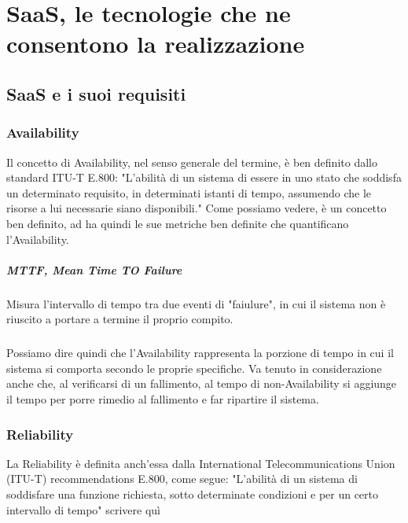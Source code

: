 \chapter{SaaS, le tecnologie che ne consentono la realizzazione}

\section{SaaS e i suoi requisiti}

\subsection{Availability}
Il concetto di Availability, nel senso generale del termine, è ben definito dallo standard ITU-T E.800: "L'abilità di un sistema di essere in uno stato che soddisfa un determinato requisito, in determinati istanti di tempo, assumendo che le risorse a lui necessarie siano disponibili." Come possiamo vedere, è un concetto ben definito, ad ha quindi le sue metriche ben definite che quantificano l'Availability. 

\paragraph{MTTF, Mean Time TO Failure}
Misura l'intervallo di tempo tra due eventi di "faiulure", in cui il sistema non è riuscito a portare a termine il proprio compito.

\paragraph{}
Possiamo dire quindi che l'Availability rappresenta la porzione di tempo in cui il sistema si comporta secondo le proprie specifiche. Va tenuto in considerazione anche che, al verificarsi di un fallimento, al tempo di non-Availability si aggiunge il tempo per porre rimedio al fallimento e far ripartire il sistema. 

\subsection{Reliability}
La Reliability è definita anch'essa dalla International Telecommunications Union (ITU-T) recommendations E.800, come segue: "L'abilità di un sistema di soddisfare una funzione richiesta, sotto determinate condizioni e per un certo intervallo di tempo"
scrivere quì

